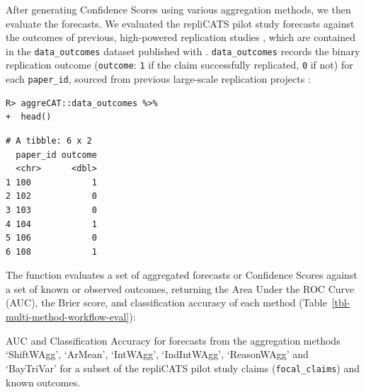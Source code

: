 \documentclass[article]{jss}
\newcommand{\fct}[1]{\code{#1()}}
\begin{document}
After generating Confidence Scores using various aggregation methods, we
then evaluate the forecasts. We evaluated the repliCATS pilot study
forecasts against the outcomes of previous, high-powered replication
studies \citep{Hanea2021}, which are contained in the
\texttt{data\_outcomes} dataset published with .
\texttt{data\_outcomes} records the binary replication outcome
(\texttt{outcome}: \texttt{1} if the claim successfully replicated,
\texttt{0} if not) for each \texttt{paper\_id}, sourced from previous
large-scale replication projects
\citep{Klein2014, Klein2018ManyL2, Ebersole2016, Camerer2018, aac4716}:

\begin{verbatim}
R> aggreCAT::data_outcomes %>%
+  head()
\end{verbatim}

\begin{verbatim}
# A tibble: 6 x 2
  paper_id outcome
  <chr>      <dbl>
1 100            1
2 102            0
3 103            0
4 104            1
5 106            0
6 108            1
\end{verbatim}

The function \fct{confidence_score_evaluation} evaluates a set of
aggregated forecasts or Confidence Scores against a set of known or
observed outcomes, returning the Area Under the ROC Curve (AUC), the
Brier score, and classification accuracy of each method
(Table~\ref{tbl-multi-method-workflow-eval}):

\begin{table}


\caption{\label{tbl-multi-method-workflow-eval}AUC and Classification
Accuracy for forecasts from the aggregation methods `ShiftWAgg',
`ArMean', `IntWAgg', `IndIntWAgg', `ReasonWAgg' and `BayTriVar' for a
subset of the repliCATS pilot study claims (\texttt{focal\_claims}) and
known outcomes.}

\end{table}%
\end{document}
